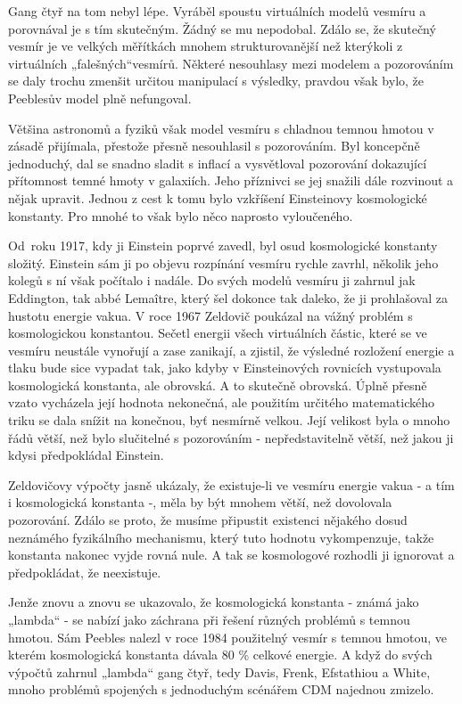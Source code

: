   Gang čtyř na tom nebyl lépe. Vyráběl spoustu virtuálních modelů vesmíru a porovnával je s tím
  skutečným. Žádný se mu nepodobal. Zdálo se, že skutečný vesmír je ve velkých měřítkách mnohem
  strukturovanější než kterýkoli z virtuálních „falešných“vesmírů. Některé nesouhlasy mezi modelem a
  pozorováním se daly trochu zmenšit určitou manipulací s výsledky, pravdou však bylo, že Peeblesův
  model plně nefungoval. 
  
  Většina astronomů a fyziků však model vesmíru s chladnou temnou hmotou v zásadě přijímala,
  přestože přesně nesouhlasil s pozorováním. Byl koncepčně jednoduchý, dal se snadno sladit s
  inflací a vysvětloval pozorování dokazující přítomnost temné hmoty v galaxiích. Jeho příznivci se
  jej snažili dále rozvinout a nějak upravit. Jednou z cest k tomu bylo vzkříšení Einsteinovy
  kosmologické konstanty. Pro mnohé to však bylo něco naprosto vyloučeného. 
  
  Od roku 1917, kdy ji Einstein poprvé zavedl, byl osud kosmologické konstanty složitý. Einstein sám
  ji po objevu rozpínání vesmíru rychle zavrhl, několik jeho kolegů s ní však počítalo i nadále. Do
  svých modelů vesmíru ji zahrnul jak Eddington, tak abbé Lemaître, který šel dokonce tak daleko, že
  ji prohlašoval za hustotu energie vakua. V roce 1967 Zeldovič poukázal na vážný problém s
  kosmologickou konstantou. Sečetl energii všech virtuálních částic, které se ve vesmíru neustále
  vynořují a zase zanikají, a zjistil, že výsledné rozložení energie a tlaku bude sice vypadat tak,
  jako kdyby v Einsteinových rovnicích vystupovala kosmologická konstanta, ale obrovská. A to
  skutečně obrovská. Úplně přesně vzato vycházela její hodnota nekonečná, ale použitím určitého
  matematického triku se dala snížit na konečnou, byť nesmírně velkou. Její velikost byla o mnoho
  řádů větší, než bylo slučitelné s pozorováním - nepředstavitelně větší, než jakou ji kdysi
  předpokládal Einstein. 
  
  Zeldovičovy výpočty jasně ukázaly, že existuje-li ve vesmíru energie vakua - a tím i kosmologická
  konstanta -, měla by být mnohem větší, než dovolovala pozorování. Zdálo se proto, že musíme
  připustit existenci nějakého dosud neznámého fyzikálního mechanismu, který tuto hodnotu
  vykompenzuje, takže konstanta nakonec vyjde rovná nule. A tak se kosmologové rozhodli ji ignorovat
  a předpokládat, že neexistuje. 
  
  Jenže znovu a znovu se ukazovalo, že kosmologická konstanta - známá jako „lambda“ - se nabízí jako
  záchrana při řešení různých problémů s temnou hmotou. Sám Peebles nalezl v roce 1984 použitelný
  vesmír s temnou hmotou, ve kterém kosmologická konstanta dávala 80 \% celkové energie. A když do
  svých výpočtů zahrnul „lambda“ gang čtyř, tedy Davis, Frenk, Efstathiou a White, mnoho problémů
  spojených s jednoduchým scénářem CDM najednou zmizelo. 
  
